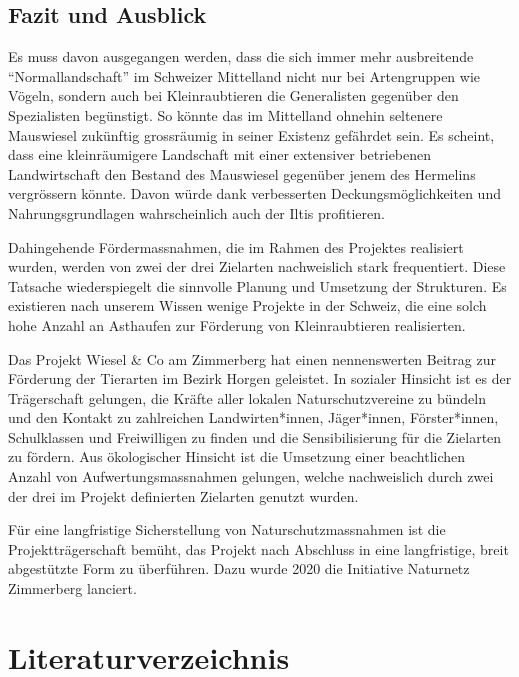 \documentclass[
  oneside]{scrbook}
\begin{document}
\hypertarget{fazit-und-ausblick}{%
\section{Fazit und Ausblick}\label{fazit-und-ausblick}}

Es muss davon ausgegangen werden, dass die sich immer mehr ausbreitende ``Normallandschaft'' im Schweizer Mittelland nicht nur bei Artengruppen wie Vögeln, sondern auch bei Kleinraubtieren die Generalisten gegenüber den Spezialisten begünstigt. So könnte das im Mittelland ohnehin seltenere Mauswiesel zukünftig grossräumig in seiner Existenz gefährdet sein. Es scheint, dass eine kleinräumigere Landschaft mit einer extensiver betriebenen Landwirtschaft den Bestand des Mauswiesel gegenüber jenem des Hermelins vergrössern könnte. Davon würde dank verbesserten Deckungsmöglichkeiten und Nahrungsgrundlagen wahrscheinlich auch der Iltis profitieren.

Dahingehende Fördermassnahmen, die im Rahmen des Projektes realisiert wurden, werden von zwei der drei Zielarten nachweislich stark frequentiert. Diese Tatsache wiederspiegelt die sinnvolle Planung und Umsetzung der Strukturen. Es existieren nach unserem Wissen wenige Projekte in der Schweiz, die eine solch hohe Anzahl an Asthaufen zur Förderung von Kleinraubtieren realisierten.

Das Projekt Wiesel \& Co am Zimmerberg hat einen nennenswerten Beitrag zur Förderung der Tierarten im Bezirk Horgen geleistet. In sozialer Hinsicht ist es der Trägerschaft gelungen, die Kräfte aller lokalen Naturschutzvereine zu bündeln und den Kontakt zu zahlreichen Landwirten*innen, Jäger*innen, Förster*innen, Schulklassen und Freiwilligen zu finden und die Sensibilisierung für die Zielarten zu fördern. Aus ökologischer Hinsicht ist die Umsetzung einer beachtlichen Anzahl von Aufwertungsmassnahmen gelungen, welche nachweislich durch zwei der drei im Projekt definierten Zielarten genutzt wurden.

Für eine langfristige Sicherstellung von Naturschutzmassnahmen ist die Projektträgerschaft bemüht, das Projekt nach Abschluss in eine langfristige, breit abgestützte Form zu überführen. Dazu wurde 2020 die Initiative Naturnetz Zimmerberg lanciert.

\hypertarget{literaturverzeichnis}{%
\chapter{Literaturverzeichnis}\label{literaturverzeichnis}}
\end{document}
